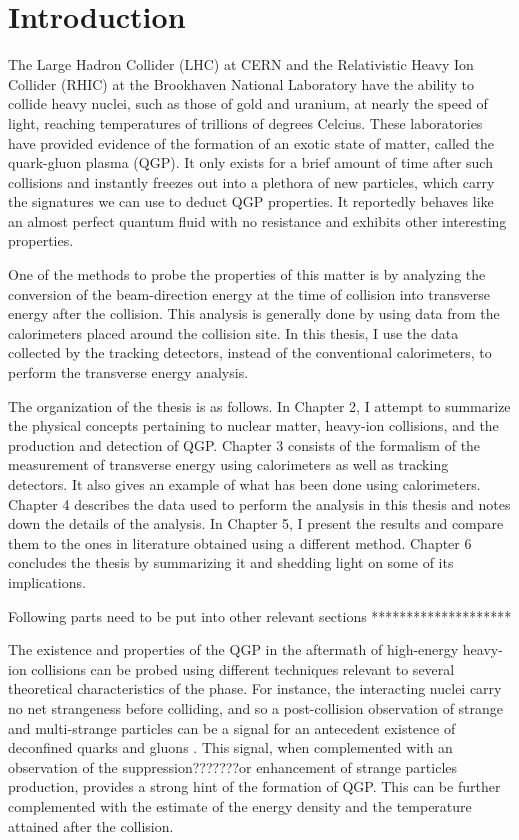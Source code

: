 \chapter{Introduction} \label{ch:introduction}

The Large Hadron Collider (LHC) at CERN and the Relativistic Heavy Ion Collider (RHIC) at the Brookhaven National Laboratory have the ability to collide heavy nuclei, such as those of gold and uranium, at nearly the speed of light, reaching temperatures of trillions of degrees Celcius. These laboratories have provided evidence of the formation of an exotic state of matter, called the quark-gluon plasma (QGP). It only exists for a brief amount of time after such collisions and instantly freezes out into a plethora of new particles, which carry the signatures we can use to deduct QGP properties. It reportedly behaves like an almost perfect quantum fluid with no resistance and exhibits other interesting properties.

One of the methods to probe the properties of this matter is by analyzing the conversion of the beam-direction energy at the time of collision into transverse energy after the collision. This analysis is generally done by using data from the calorimeters placed around the collision site. In this thesis, I use the data collected by the tracking detectors, instead of the conventional calorimeters, to perform the transverse energy analysis.

The organization of the thesis is as follows. In Chapter 2, I attempt to summarize the physical concepts pertaining to nuclear matter, heavy-ion collisions, and the production and detection of QGP. Chapter 3 consists of the formalism of the measurement of transverse energy using calorimeters as well as tracking detectors. It also gives an example of what has been done using calorimeters. Chapter 4 describes the data used to perform the analysis in this thesis and notes down the details of the analysis. In Chapter 5, I present the results and compare them to the ones in literature obtained using a different method. Chapter 6 concludes the thesis by summarizing it and shedding light on some of its implications.

Following parts need to be put into other relevant sections ********************

The existence and properties of the QGP in the aftermath of high-energy heavy-ion collisions can be probed using different techniques relevant to several theoretical characteristics of the phase. For instance, the interacting nuclei  carry no net strangeness before colliding, and so a post-collision observation of strange and multi-strange particles can be a signal for an antecedent existence of deconfined quarks and gluons \cite{1742-6596-455-1-012005}. This signal, when complemented with an observation of the suppression???????or enhancement of strange particles production, provides a strong hint of the formation of QGP. This can be further complemented with the estimate of the energy density and the temperature attained after the collision.

